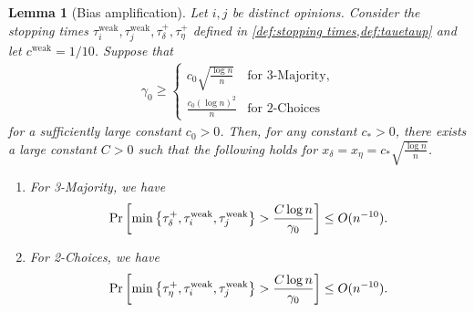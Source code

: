\documentclass[letterpaper,11pt]{article}
\newtheorem{lemma}[theorem]{Lemma}
\newcommand{\alphanorm}{\gamma}
\newcommand{\taudeltaplus}{\tau^{+}_\delta}
\newcommand{\tauetaplus}{\tau^{+}_\eta}
\newcommand{\cweak}{c^{\mathrm{weak}}}
\newcommand{\tauiweak}{\tau^{\mathrm{weak}}_i}
\newcommand{\taujweak}{\tau^{\mathrm{weak}}_j}
\newcommand{\xdelta}{x_{\delta}}
\newcommand{\xeta}{x_{\eta}}
\begin{document}
\begin{lemma}[Bias amplification] \label{lem:gap amplification}
  Let $ i,j $ be distinct opinions. %
  Consider the stopping times $\tauiweak,\taujweak,\taudeltaplus,\tauetaplus$ defined in \cref{def:stopping times,def:tauetaup} and let $\cweak=1/10$.
  Suppose that
  \begin{align*}
    \alphanorm_0 \ge \begin{cases}
      c_0 \sqrt{\frac{\log n}{n}}	& \text{for 3-Majority},\\
      \frac{c_0(\log n)^2}{n} & \text{for 2-Choices}
    \end{cases}
  \end{align*}
  for a sufficiently large constant $c_0>0$.
  Then, for any constant $ c_{*}>0 $, there exists a large constant $ C>0 $ such that the following holds
  for $ \xdelta = \xeta = c_{*}\sqrt{\frac{\log n}{n}}$.
  \begin{enumerate}
            \renewcommand{\labelenumi}{(\roman{enumi})}
  \item For 3-Majority, we have
  \begin{align*} 
    \Pr\qty[ \min\qty{ \taudeltaplus, \tauiweak,\taujweak } > \frac{C\log n}{\alphanorm_0} ] \le O(n^{-10}).
  \end{align*}
  \item For 2-Choices, we have
  \begin{align*}
    \Pr\qty[ \min\qty{ \tauetaplus, \tauiweak,\taujweak } > \frac{C\log n}{\alphanorm_0} ] \le O(n^{-10}).
  \end{align*}
  \end{enumerate}
\end{lemma}
\end{document}
